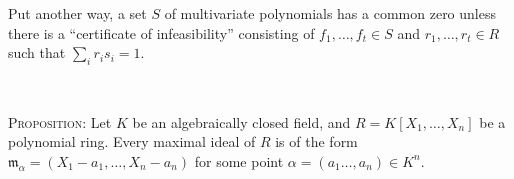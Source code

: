 \documentclass[12pt]{amsart}
\newcommand{\m}{\mathfrak{m}}
\newcommand{\0}{$\phantom{.}$}
\newcommand{\1}{\mathbbm{1}}
\begin{document}
Put another way, a set $S$ of multivariate polynomials has a common zero unless there is a ``certificate of infeasibility'' consisting of $f_1,\dots,f_t\in S$ and $r_1,\dots,r_t\in R$ such that $\sum_i r_i s_i = 1$.

\

\noindent \textsc{Proposition:} Let $K$ be an algebraically closed field, and $R=K[X_1,\dots,X_n]$ be a polynomial ring. Every maximal ideal of $R$ is of the form $\m_\alpha = (X_1-a_1,\dots,X_n-a_n)$ for some point $\alpha=(a_1\dots,a_n)\in K^n$.




\begin{comment}


\end{comment}
\end{document}
